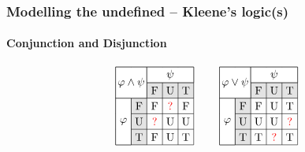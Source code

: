 \documentclass[xcolor=x11names]{beamer}
\newcommand{\cemph}[1]{\textcolor{red}{#1}}
\begin{document}
\begin{frame}
	\frametitle{Modelling the undefined -- Kleene's logic(s)}
	\framesubtitle{Conjunction and Disjunction}
\footnotesize

\[\begin{tikzpicture}[scale=.5]
\node at (0,0){};
\draw [step=1cm] (-1,-4) node (v1) {} grid (4,1);
\draw[fill=white]  (v1) rectangle (0,-1);
\draw[fill=white]  (-1,1) rectangle (1,-1) node (v2) {};
\draw[fill=white]  (1,1) rectangle (4,0);
\draw[fill=black, opacity=.1]  (v2) node (v3) {} rectangle (4,0);
\draw[fill=black, opacity=.1]  (v3) rectangle (0,-4);
\node at (0,0) {$\varphi\land \psi$};
\node at (-0.5,-2.5) {$\varphi$};
\node at (2.5,0.5) {$\psi$};
\node at (0.5,-1.5) {F};
\node at (0.5,-2.5) {U};
\node at (0.5,-3.5) {T};
\node at (1.5,-0.5) {F};
\node at (2.5,-0.5) {U};
\node at (3.5,-0.5) {T};
\node at (1.5,-1.5) {F};
\node at (2.5,-1.5) {\cemph{?}};
\node at (3.5,-1.5) {F};
\node at (1.5,-2.5) {\cemph{?}};
\node at (2.5,-2.5) {U};
\node at (3.5,-2.5) {U};
\node at (1.5,-3.5) {F};
\node at (2.5,-3.5) {U};
\node at (3.5,-3.5) {T};
\end{tikzpicture}
\qquad %
\begin{tikzpicture}[scale=.5]
\node at (0,0){};
\draw [step=1cm] (-1,-4) node (v1) {} grid (4,1);
\draw[fill=white]  (v1) rectangle (0,-1);
\draw[fill=white]  (-1,1) rectangle (1,-1) node (v2) {};
\draw[fill=white]  (1,1) rectangle (4,0);
\draw[fill=black, opacity=.1]  (v2) node (v3) {} rectangle (4,0);
\draw[fill=black, opacity=.1]  (v3) rectangle (0,-4);
\node at (0,0) {$\varphi\lor \psi$};
\node at (-0.5,-2.5) {$\varphi$};
\node at (2.5,0.5) {$\psi$};
\node at (0.5,-1.5) {F};
\node at (0.5,-2.5) {U};
\node at (0.5,-3.5) {T};
\node at (1.5,-0.5) {F};
\node at (2.5,-0.5) {U};
\node at (3.5,-0.5) {T};
\node at (1.5,-1.5) {F};
\node at (2.5,-1.5) {U};
\node at (3.5,-1.5) {T};
\node at (1.5,-2.5) {U};
\node at (2.5,-2.5) {U};
\node at (3.5,-2.5) {\cemph{?}};
\node at (1.5,-3.5) {T};
\node at (2.5,-3.5) {\cemph{?}};
\node at (3.5,-3.5) {T};
\end{tikzpicture}\]

\pause %


\end{frame}
\end{document}
